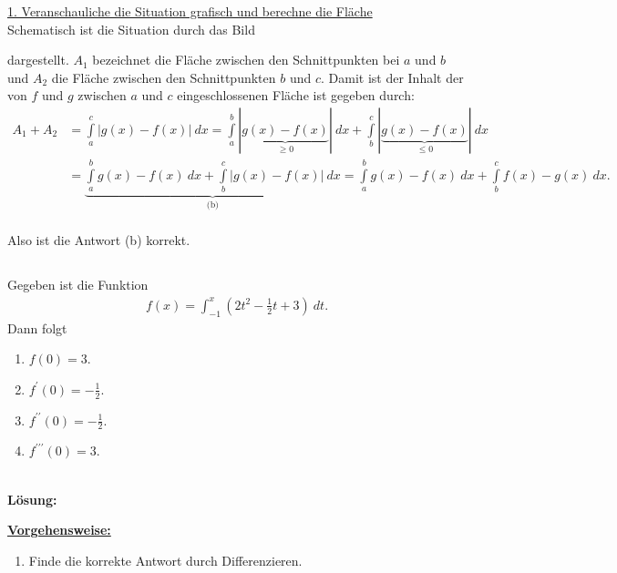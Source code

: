 \underline{1. Veranschauliche die Situation grafisch und berechne die Fläche}\\
Schematisch ist die Situation durch das Bild
\begin{center}
\end{center}
dargestellt. $ A_1 $ bezeichnet die Fläche zwischen den Schnittpunkten bei $ a $ und $ b $ und $ A_2 $ die Fläche zwischen den Schnittpunkten $ b $ und $ c $.
Damit ist der Inhalt der von $ f $ und $ g $ zwischen $ a $ und $ c $ eingeschlossenen Fläche ist gegeben durch:
\begin{align*}
A_1 + A_2 
&=
\int 
\limits_{a}^c | g(x) - f(x) | \ dx
=
\int \limits_{a}^b | \underbrace{g(x) - f(x)}_{\geq 0} | \ dx + 
\int \limits_{b}^c | \underbrace{g(x) - f(x)}_{\leq 0} | \ dx\\
&=
\underbrace{\int\limits_{a}^b  g(x ) - f(x)  \ dx +  
\int\limits_{b}^c | g(x) - f(x) | \ dx}_{\textrm{(b)}}
=
\int \limits_{a}^b  g(x ) - f(x)  \ dx + 
 \int\limits_{b}^c f(x) - g(x)  \ dx.
\end{align*}
\ \\
Also ist die Antwort (b) korrekt.

\newpage
\subsection*{}
Gegeben ist die Funktion
\begin{align*}
f(x) = \int_{-1}^x \left( 2 t^2 - \frac{1}{2}t +3 \right) \ dt.
\end{align*}
Dann folgt
\renewcommand{\labelenumi}{(\alph{enumi})}
\begin{enumerate}
	\item 
	$ f(0) = 3 $.
	\item 
	$ f^\prime(0) = - \frac{1}{2} $.
	\item 
	$ f^{\prime \prime}(0) = - \frac{1}{2} $.
	\item 
	$ f^{\prime \prime \prime}(0) = 3 $.
\end{enumerate}
\ \\
\textbf{Lösung:}
\begin{mdframed}
\underline{\textbf{Vorgehensweise:}}
\renewcommand{\labelenumi}{\theenumi.}
\begin{enumerate}
\item Finde die korrekte Antwort durch Differenzieren.
\end{enumerate}
\end{mdframed}

